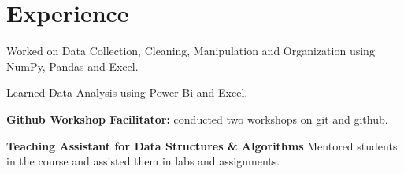\documentclass[]{m abbas resume' 2022}
\begin{document}
\begin{minipage}[t]{0.45\textwidth} 
    

    
\section{Experience}
\vspace{\topsep} %
\begin{tightemize}
\sectionsep
\item Worked on Data Collection, Cleaning, Manipulation and Organization using
    NumPy, Pandas and Excel.
\end{tightemize}  
  
\begin{tightemize}
\sectionsep
\item Learned Data Analysis using Power Bi and Excel. 
\end{tightemize}

\begin{tightemize}
\item \textbf{Github Workshop Facilitator: }conducted two workshops on git and
    github. %
\item \textbf{Teaching Assistant for Data Structures \& Algorithms} Mentored
    students in the course and assisted them in labs and assignments.

\end{tightemize}  
%
%


\end{minipage}
\end{document}
